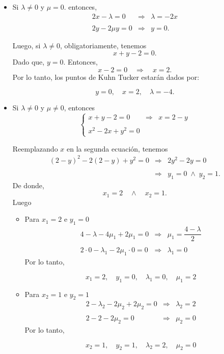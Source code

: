 \begin{enumerate}
\begin{itemize}
	    \item Si $\lambda \neq 0$ y $\mu=0$. entonces,
		$$\begin{array}{rcl}
		    2x-\lambda = 0 &\Rightarrow & \lambda = -2x\\\\
		    2y-2\mu y = 0 &\Rightarrow& y=0.
		\end{array}$$

		Luego, si $\lambda \neq 0$, obligatoriamente, tenemos
		$$x+y-2=0.$$
		Dado que, $y=0$. Entonces,
		$$x-2=0\quad \Rightarrow \quad x=2.$$
		Por lo tanto, los puntos de Kuhn Tucker estarán dados por:
		\begin{tcolorbox}
		    $$y=0,\quad x=2,\quad \lambda = -4.$$
		\end{tcolorbox}

	    \item Si $\lambda \neq 0$ y $\mu \neq 0$, entonces
		$$\left\{\begin{array}{rcl}
		    x+y-2=0 &\Rightarrow & x=2-y\\\\
		    x^2-2x+y^2=0&&
		\end{array}\right.$$

		Reemplazando $x$ en la segunda ecuación, tenemos
		$$\begin{array}{rcl}
		    (2-y)^2-2(2-y)+y^2=0 &\Rightarrow & 2y^2-2y=0\\\\
					 &\Rightarrow & y_1=0 \; \land \; y_2=1.
		\end{array}$$
		De donde,
		$$x_1=2 \quad \land \quad x_2=1.$$
		Luego \\
		\begin{itemize}
		    \item Para $x_1=2$ e $y_1=0$
		    $$\begin{array}{rcl}
			4-\lambda-4\mu_1+2\mu_1 = 0 &\Rightarrow & \mu_1 = \dfrac{4-\lambda}{2}\\\\
			2\cdot 0-\lambda_1 - 2\mu_1 \cdot 0 = 0 &\Rightarrow & \lambda_1 = 0
		    \end{array}$$
		    Por lo tanto,
		    \begin{tcolorbox}
			$$x_1=2,\quad y_1=0, \quad \lambda_1 = 0, \quad \mu_1=2$$
		    \end{tcolorbox}
		    \item Para $x_2=1$ e $y_2=1$
		    $$\begin{array}{rcl}
			2-\lambda_2 -2\mu_2 + 2\mu_2 = 0 &\Rightarrow&\lambda_2 = 2\\\\
			2-2 -2\mu_2  = 0 &\Rightarrow&\mu_2 = 0
		    \end{array}$$
		    Por lo tanto,
		    \begin{tcolorbox}
			$$x_2=1,\quad y_2=1, \quad \lambda_2 = 2, \quad \mu_2=0$$
		    \end{tcolorbox}


\end{itemize}
\end{itemize}
\end{enumerate}
